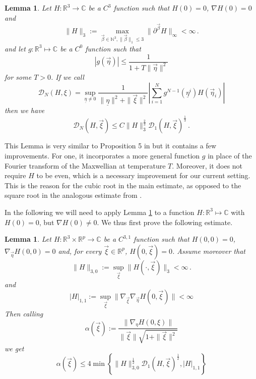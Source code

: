 \documentclass{article}
\newcommand\calD{{\mathcal D}}
\newcommand \ul[1]{\underline{#1}}
\renewcommand\v[1]{\vec{#1}}
\newcommand*\R{ \mathds{R} }
\newcommand\set[1]{\left\{ #1 \right\}}
\newtheorem{mylemma}[mythm]{Lemma}
\begin{document}
\begin{mylemma} \label{lem:prop5} 
Let $H: \mathds R^3\to\mathds C$ be a $C^3$ function such that $H(0)=0$, $\nabla H(0)=0$ and
\begin{equation}\label{eq:H3}
 \|H\|_3:=\max_{\v\beta\in\mathds N^3, \|\v\beta\|_1\leq 3}\bigl\|
\partial^{\v\beta}H\bigr\|_\infty<\infty\, .
\end{equation}
and let $g:\mathds R^3\mapsto \mathds C$ be a $C^0$ function such that
\[
|g(\v\eta)|\leq \frac1{1+T\|\v\eta\|^2}
\]
for some $T>0$. If we call
\[
\mathcal D_N(H,\xi)=\sup_{\ul \eta\not=0}\frac{1}{\|\ul \eta\|^2+\|\v\xi\|^2}
\left|\sum_{i=1}^N g^{ N - 1}(\ul \eta^i)H(\v\eta_i)\right|
\]
then we have 
\begin{equation}\label{eq:estima1}
\mathcal D_N(H,\v\xi)\leq C \|H\|_3^{\frac 23}\mathcal D_1(H,\v\xi)^{\frac13}\, .
\end{equation}
\end{mylemma}
 
 This Lemma is very similar to Proposition 5 in \cite{BLTV} but it contains a few improvements. For one, it
incorporates a more general function $g$ in place of the Fourier transform of the Maxwellian at temperature $T$.
Moreover, it does not require $H$ to be even, which is a necessary improvement for our current setting. This is the
reason for  the cubic root in the main estimate, as opposed to the square root in the analogous estimate from
\cite{BLTV}.

In the following we will need to apply Lemma \ref{lem:prop5} to a function $H:\mathds R^3\mapsto \mathds C$ with 
$H(0)=0$, but $\nabla H(0)\not =0$. We thus first prove the following estimate.

 \begin{mylemma} \label{lem:stimal} 
Let $H: \mathds R^3\times \mathds R^p\to\mathds C$ be a $C^{3,1}$ function such that  $H(0,0)=0$,
$\nabla_{\v\eta}H(0,0)=0$ and, for every $\v\xi\in\R^p$, $H(0,\v\xi)=0$. Assume moreover that
\begin{equation}\label{eq:HDerivBounds1}
\|H\|_{3,0}:=\sup_{\v\xi}\|H(\cdot,\v\xi)\|_3<\infty\,. 
\end{equation}
and
 \begin{equation}\label{eq:HDerivBounds2}
|H|_{1,1}:=\sup_{\v\xi}\bigl\|\nabla_{\v\xi}\nabla_{\v\eta} H(0,\v\xi)\bigr\| < \infty
\end{equation}
Then calling
\begin{equation}\label{eq:defalpha}
\alpha(\v\xi) := \frac{\|\nabla_\eta H(0,\xi)\|}{\|\v\xi\|\sqrt{1 +\|\v\xi\|^2}}
\end{equation}
we get
\begin{equation}
\alpha(\v\xi)\leq 4\min\set{\|H\|_{3,0}^{\frac12}\calD_1(H,\v\xi)^{\frac12},|H|_{1,1}}
\end{equation}
\end{mylemma}
\end{document}

